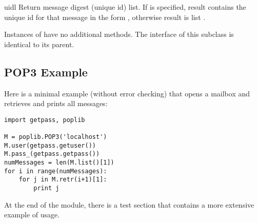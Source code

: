 \begin{methoddesc}{uidl}{}
Return message digest (unique id) list.
If  is specified, result contains the unique id for that
message in the form ,
otherwise result is list .
\end{methoddesc}

Instances of  have no additional methods. The
interface of this subclass is identical to its parent.


\subsection{POP3 Example \label{pop3-example}}

Here is a minimal example (without error checking) that opens a
mailbox and retrieves and prints all messages:

\begin{verbatim}
import getpass, poplib

M = poplib.POP3('localhost')
M.user(getpass.getuser())
M.pass_(getpass.getpass())
numMessages = len(M.list()[1])
for i in range(numMessages):
    for j in M.retr(i+1)[1]:
        print j
\end{verbatim}

At the end of the module, there is a test section that contains a more
extensive example of usage.
